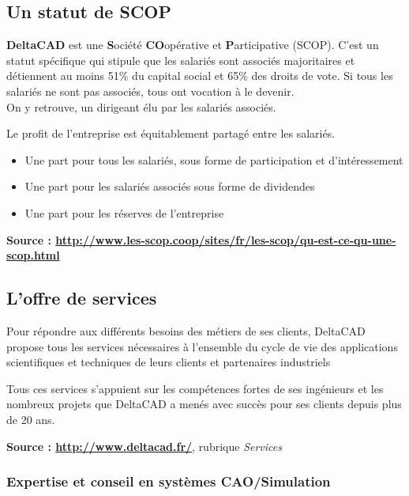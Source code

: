 \subsection{Un statut de SCOP}

\textbf{DeltaCAD} est une \textbf{S}ociété  \textbf{CO}opérative et \textbf{P}articipative (SCOP). C'est un statut spécifique qui stipule que les salariés sont associés majoritaires et détiennent au moins 51\% du capital social et 65\% des droits de vote. Si tous les salariés ne sont pas associés, tous ont vocation à le devenir.\\
On y retrouve, un dirigeant élu par les salariés associés.

Le profit de l'entreprise est équitablement partagé entre les salariés.
\begin{itemize}
  \item Une part pour tous les salariés, sous forme de participation et d’intéressement
  \item Une part pour les salariés associés sous forme de dividendes
  \item Une part pour les réserves de l’entreprise 
\end{itemize}
\vspace{5mm}

\textbf{Source : \url{http://www.les-scop.coop/sites/fr/les-scop/qu-est-ce-qu-une-scop.html}}

\subsection{L'offre de services}

Pour répondre aux différents besoins des métiers de ses clients, DeltaCAD propose tous les services nécessaires à l'ensemble du cycle de vie des applications scientifiques et techniques de leurs clients et partenaires industriels

Tous ces services s'appuient sur les compétences fortes de ses ingénieurs et les nombreux projets que DeltaCAD a menés avec succès pour ses clients depuis plus de 20 ans.

\textbf{Source : \url{http://www.deltacad.fr/}}, rubrique \textit{Services}

\subsubsection{Expertise et conseil en systèmes CAO/Simulation}


